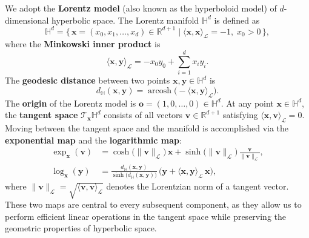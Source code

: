 We adopt the \textbf{Lorentz model} (also known as the hyperboloid model) of $d$-dimensional hyperbolic space.
The Lorentz manifold $\mathbb{H}^d$ is defined as
\begin{equation}\label{eq:lorentz_def}
  \mathbb{H}^{d} = \bigl\{\, \mathbf{x} = (x_0, x_1, \dots, x_d) \in \mathbb{R}^{d+1}
  \;\big|\; \langle \mathbf{x}, \mathbf{x} \rangle_{\mathcal{L}} = -1,\; x_0 > 0 \,\bigr\},
\end{equation}
where the \textbf{Minkowski inner product} is
\begin{equation}\label{eq:minkowski}
  \langle \mathbf{x}, \mathbf{y} \rangle_{\mathcal{L}}
  = -x_0 y_0 + \sum_{i=1}^{d} x_i y_i.
\end{equation}
The \textbf{geodesic distance} between two points $\mathbf{x}, \mathbf{y} \in \mathbb{H}^d$ is
\begin{equation}\label{eq:lorentz_dist}
  d_{\mathbb{H}}(\mathbf{x}, \mathbf{y})
  = \operatorname{arcosh}\!\bigl(-\langle \mathbf{x}, \mathbf{y} \rangle_{\mathcal{L}}\bigr).
\end{equation}
The \textbf{origin} of the Lorentz model is $\mathbf{o} = (1, 0, \dots, 0) \in \mathbb{H}^d$.
At any point $\mathbf{x} \in \mathbb{H}^d$, the \textbf{tangent space} $\mathcal{T}_{\mathbf{x}}\mathbb{H}^d$ consists of all vectors $\mathbf{v} \in \mathbb{R}^{d+1}$ satisfying $\langle \mathbf{x}, \mathbf{v} \rangle_{\mathcal{L}} = 0$.
Moving between the tangent space and the manifold is accomplished via the \textbf{exponential map} and the \textbf{logarithmic map}:
\begin{align}
  \exp_{\mathbf{x}}(\mathbf{v})
  &= \cosh\!\bigl(\|\mathbf{v}\|_{\mathcal{L}}\bigr)\,\mathbf{x}
     + \sinh\!\bigl(\|\mathbf{v}\|_{\mathcal{L}}\bigr)\,
       \frac{\mathbf{v}}{\|\mathbf{v}\|_{\mathcal{L}}}, \label{eq:exp_map} \\[4pt]
  \log_{\mathbf{x}}(\mathbf{y})
  &= \frac{d_{\mathbb{H}}(\mathbf{x},\mathbf{y})}
          {\sinh\!\bigl(d_{\mathbb{H}}(\mathbf{x},\mathbf{y})\bigr)}\,
     \bigl(\mathbf{y} + \langle \mathbf{x}, \mathbf{y} \rangle_{\mathcal{L}}\,\mathbf{x}\bigr),
  \label{eq:log_map}
\end{align}
where $\|\mathbf{v}\|_{\mathcal{L}} = \sqrt{\langle \mathbf{v}, \mathbf{v} \rangle_{\mathcal{L}}}$ denotes the Lorentzian norm of a tangent vector.
These two maps are central to every subsequent component, as they allow us to perform efficient linear operations in the tangent space while preserving the geometric properties of hyperbolic space.

